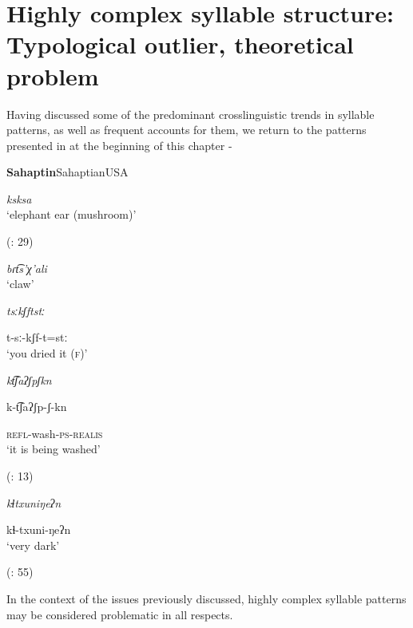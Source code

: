 \section{Highly complex syllable structure: Typological outlier, theoretical problem}\label{sec:1.2}

  Having discussed some of the predominant crosslinguistic trends in syllable patterns, as well as frequent accounts for them, we return to the patterns presented in at the beginning of this chapter -

\ea\label{ex:1.8}
 \textbf{Sahaptin}{Sahaptian}{USA}

\textit{ksksa}\\
\glt ‘elephant ear (mushroom)’

(\citealt{HargusBeavert2006}: 29)
\z

\ea\label{ex:1.9}

\textit{bɾt͡s’χ’ali}\\
\glt ‘claw’
\citep[204]{Butskhrikidze2002}
\z

\ea\label{ex:1.10}

\textit{tsːkʃftstː}

t-sː-kʃf-t=stː\\
\glt ‘you dried it (\textsc{f})’
\citep[332]{Ridouane2008}
\z

\ea\label{ex:1.11}

\textit{kt͡ʃaʔʃpʃkn}

k-t͡ʃaʔʃp-ʃ-kn

\textsc{refl}-wash-\textsc{ps-realis}\\
\glt ‘it is being washed’

(\citealt{FernándezGarayHernández2006}: 13)
\z

\ea\label{ex:1.12}

\textit{kɬtxuniŋeʔn}

kɬ-txuni-ŋeʔn\\
\glt ‘very dark’

(\citealt{GeorgVolodin1999}: 55)
\z

In the context of the issues previously discussed, highly complex syllable patterns may be considered problematic in all respects.

